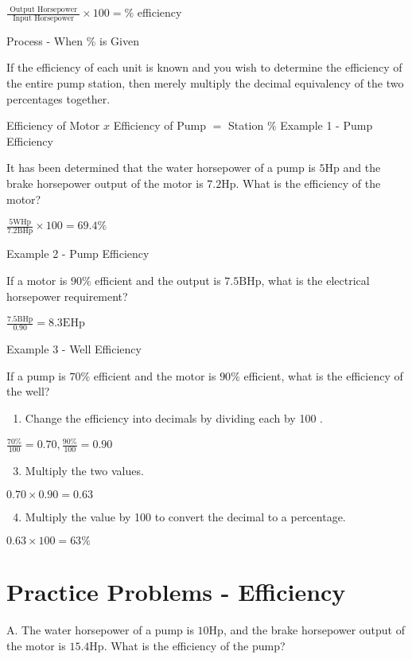 $\frac{\text { Output Horsepower }}{\text { Input Horsepower }} \times 100=\%$ efficiency

Process - When \% is Given

If the efficiency of each unit is known and you wish to determine the efficiency of the entire pump station, then merely multiply the decimal equivalency of the two percentages together.

Efficiency of Motor $x$ Efficiency of Pump $=$ Station $\%$ Example 1 - Pump Efficiency

It has been determined that the water horsepower of a pump is $5 \mathrm{Hp}$ and the brake horsepower output of the motor is $7.2 \mathrm{Hp}$. What is the efficiency of the motor?

$\frac{5 \mathrm{WHp}}{7.2 \mathrm{BHp}} \times 100=69.4 \%$

Example 2 - Pump Efficiency

If a motor is $90 \%$ efficient and the output is $7.5 \mathrm{BHp}$, what is the electrical horsepower requirement?

$\frac{7.5 \mathrm{BHp}}{0.90}=8.3 \mathrm{EHp}$

Example 3 - Well Efficiency

If a pump is $70 \%$ efficient and the motor is $90 \%$ efficient, what is the efficiency of the well?

\begin{enumerate}
  \item Change the efficiency into decimals by dividing each by 100 .
\end{enumerate}
$\frac{70 \%}{100}=0.70, \frac{90 \%}{100}=0.90$

\begin{enumerate}
  \setcounter{enumi}{2}
  \item Multiply the two values.
\end{enumerate}
$0.70 \times 0.90=0.63$

\begin{enumerate}
  \setcounter{enumi}{3}
  \item Multiply the value by 100 to convert the decimal to a percentage.
\end{enumerate}
$0.63 \times 100=63 \%$

\section{Practice Problems - Efficiency}
A. The water horsepower of a pump is $10 \mathrm{Hp}$, and the brake horsepower output of the motor is $15.4 \mathrm{Hp}$. What is the efficiency of the pump?

